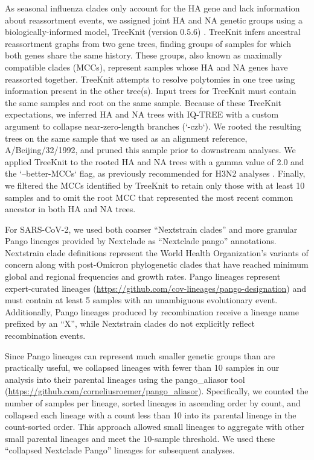 \documentclass[10pt,letterpaper]{article}
\begin{document}
As seasonal influenza clades only account for the HA gene and lack information about reassortment events, we assigned joint HA and NA genetic groups using a biologically-informed model, TreeKnit (version 0.5.6) \cite{Barrat-Charlaix2022}.
TreeKnit infers ancestral reassortment graphs from two gene trees, finding groups of samples for which both genes share the same history.
These groups, also known as maximally compatible clades (MCCs), represent samples whose HA and NA genes have reassorted together.
TreeKnit attempts to resolve polytomies in one tree using information present in the other tree(s).
Input trees for TreeKnit must contain the same samples and root on the same sample.
Because of these TreeKnit expectations, we inferred HA and NA trees with IQ-TREE with a custom argument to collapse near-zero-length branches (`-czb`).
We rooted the resulting trees on the same sample that we used as an alignment reference, A/Beijing/32/1992, and pruned this sample prior to downstream analyses.
We applied TreeKnit to the rooted HA and NA trees with a gamma value of 2.0 and the `--better-MCCs` flag, as previously recommended for H3N2 analyses \cite{Barrat-Charlaix2022}.
Finally, we filtered the MCCs identified by TreeKnit to retain only those with at least 10 samples and to omit the root MCC that represented the most recent common ancestor in both HA and NA trees.

For SARS-CoV-2, we used both coarser ``Nextstrain clades'' \cite{Hodcroft2020,Bedford2021,Roemer2022} and more granular Pango lineages \cite{OToole2021} provided by Nextclade as ``Nextclade pango'' annotations.
Nextstrain clade definitions represent the World Health Organization's variants of concern along with post-Omicron phylogenetic clades that have reached minimum global and regional frequencies and growth rates.
Pango lineages represent expert-curated lineages (\href{https://github.com/cov-lineages/pango-designation}{https://github.com/cov-lineages/pango-designation}) and must contain at least 5 samples with an unambiguous evolutionary event.
Additionally, Pango lineages produced by recombination receive a lineage name prefixed by an ``X'', while Nextstrain clades do not explicitly reflect recombination events.

Since Pango lineages can represent much smaller genetic groups than are practically useful, we collapsed lineages with fewer than 10 samples in our analysis into their parental lineages using the pango\_aliasor tool (\href{https://github.com/corneliusroemer/pango_aliasor}{https://github.com/corneliusroemer/pango\_aliasor}).
Specifically, we counted the number of samples per lineage, sorted lineages in ascending order by count, and collapsed each lineage with a count less than 10 into its parental lineage in the count-sorted order.
This approach allowed small lineages to aggregate with other small parental lineages and meet the 10-sample threshold.
We used these ``collapsed Nextclade Pango'' lineages for subsequent analyses.
\end{document}
